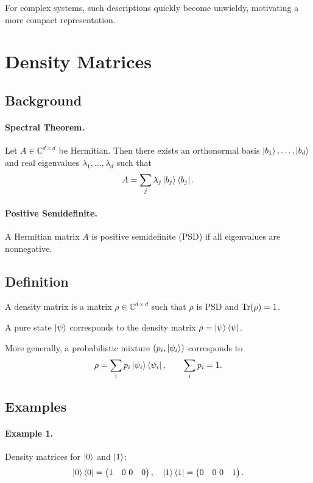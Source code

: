 For complex systems, such descriptions quickly become unwieldy, motivating a more compact representation.

\section{Density Matrices}

\subsection{Background}

\paragraph{Spectral Theorem.} Let $A \in \mathbb{C}^{d \times d}$ be Hermitian. Then there exists an orthonormal basis ${\ket{b_1},\ldots,\ket{b_d}}$ and real eigenvalues $\lambda_1,\ldots,\lambda_d$ such that
\begin{equation}
  A = \sum_j \lambda_j \ket{b_j}\bra{b_j}.
\end{equation}

\paragraph{Positive Semidefinite.} A Hermitian matrix $A$ is positive semidefinite (PSD) if all eigenvalues are nonnegative.

\subsection{Definition}

A density matrix is a matrix $\rho \in \mathbb{C}^{d \times d}$ such that $\rho$ is PSD and $\Tr(\rho)=1$.

A pure state $\ket{\psi}$ corresponds to the density matrix $\rho = \ket{\psi}\bra{\psi}$.

More generally, a probabilistic mixture ${(p_i,\ket{\psi_i})}$ corresponds to
\begin{equation}
  \rho = \sum_i p_i \ket{\psi_i}\bra{\psi_i}, \qquad \sum_i p_i = 1.
\end{equation}

\subsection{Examples}

\paragraph{Example 1.} Density matrices for $\ket{0}$ and $\ket{1}$:
\begin{equation}
  \ket{0}\bra{0} = \begin{pmatrix} 1 & 0 \ 0 & 0 \end{pmatrix}, \quad
  \ket{1}\bra{1} = \begin{pmatrix} 0 & 0 \ 0 & 1 \end{pmatrix}.
\end{equation}

